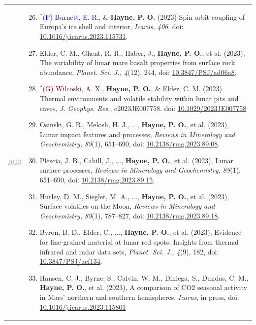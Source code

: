 \documentclass[letterpaper,10pt,twoside]{article}
\begin{document}
\begin{longtable}{@{} p{} p{}}
\noindent\textcolor{darkgray}{2023} &
        \begin{enumerate}[leftmargin=!,labelindent=2.5pt,itemindent=-10pt]\setcounter{enumi}{25}
            \item{\small \textcolor{blue}{$^*$(P) Burnett, E. R.}, \& \textbf{Hayne, P. O.} (2023) Spin-orbit coupling of Europa's ice shell and interior, \textit{Icarus, 406}, doi: \href{https://doi.org/10.1016/j.icarus.2023.115731}{10.1016/j.icarus.2023.115731}.
            }
            \item{\small Elder, C. M., Ghent, R. R., Haber, J., \textbf{Hayne, P. O.}, et al. (2023), The variability of lunar mare basalt properties from surface rock abundance, \textit{Planet. Sci. J., 4}(12), 244, doi: \href{https://doi.org/10.3847/PSJ/ad06a8}{10.3847/PSJ/ad06a8}.
            }
            \item{\small \textcolor{darkred}{$^*$(G) Wilcoski, A. X.}, \textbf{Hayne, P. O.}, \& Elder, C. M. (2023) Thermal environments and volatile stability within lunar pits and caves, \textit{J. Geophys. Res.}, e2023JE007758. doi: \href{https://doi.org/10.1029/2023JE007758}{10.1029/2023JE007758}
            }
            \item {\small Osinski, G. R., Melosh, H. J., ..., \textbf{Hayne, P. O.}, et al. (2023), Lunar impact features and processes, \textit{Reviews in Mineralogy and Geochemistry, 89}(1), 651--690, doi: \href{https://doi.org/10.2138/rmg.2023.89.08}{10.2138/rmg.2023.89.08}.
            }
            \item {\small Plescia, J. B., Cahill, J., ..., \textbf{Hayne, P. O.}, et al. (2023), Lunar surface processes, \textit{Reviews in Mineralogy and Geochemistry, 89}(1), 651--690, doi: \href{https://doi.org/10.2138/rmg.2023.89.15}{10.2138/rmg.2023.89.15}.
            }
            \item {\small Hurley, D. M., Siegler, M. A., ..., \textbf{Hayne, P. O.}, et al. (2023), Surface volatiles on the Moon, \textit{Reviews in Mineralogy and Geochemistry, 89}(1), 787--827, doi: \href{https://doi.org/10.2138/rmg.2023.89.18}{10.2138/rmg.2023.89.18}.
            }
            \item {\small Byron, B. D., Elder, C., ..., \textbf{Hayne, P. O.}, et al. (2023), Evidence for fine-grained material at lunar red spots: Insights from thermal infrared and radar data sets, \textit{Planet. Sci. J., 4}(9), 182, doi: \href{https://doi.org/10.3847/PSJ/acf134}{10.3847/PSJ/acf134}.
            }
            \item {\small Hansen, C. J., Byrne, S., Calvin, W. M., Diniega, S., Dundas, C. M., \textbf{Hayne, P. O.}, et al. (2023), A comparison of CO2 seasonal activity in Mars' northern and southern hemispheres, \textit{Icarus}, in press, doi: \href{https://doi.org/10.1016/j.icarus.2023.115801}{10.1016/j.icarus.2023.115801}
}
\end{enumerate}
\end{longtable}
\end{document}
